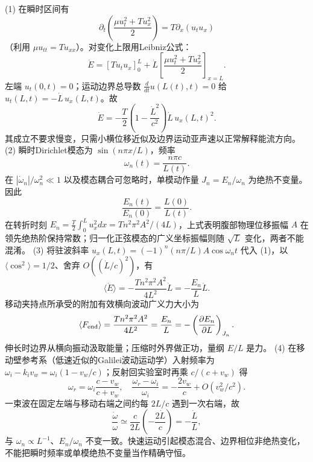(1) 在瞬时区间有
\[
\partial_t\!\left(\frac{\mu u_t^2+Tu_x^2}{2}\right)
=T\partial_x(u_tu_x)
\]
（利用 \(\mu u_{tt}=Tu_{xx}\)）。对变化上限用Leibniz公式：
\[
\dot E=[Tu_tu_x]_0^{L}+
\dot L\left[\frac{\mu u_t^2+Tu_x^2}{2}\right]_{x=L}.
\]
左端 \(u_t(0,t)=0\)；运动边界总导数 \(\frac d{dt}u(L(t),t)=0\) 给 \(u_t(L,t)=-\dot L\,u_x(L,t)\)。故
\[
\boxed{\dot E=-\frac T2\left(1-\frac{\dot L^2}{c^2}\right)\dot L\,u_x(L,t)^2}.
\]
其成立不要求慢变，只需小横位移近似及边界运动亚声速以正常解释能流方向。
(2) 瞬时Dirichlet模态为 \(\sin(n\pi x/L)\)，频率
\[
\omega_n(t)=\frac{n\pi c}{L(t)}.
\]
在 \(|\dot\omega_n|/\omega_n^2\ll1\) 以及模态耦合可忽略时，单模动作量 \(J_n=E_n/\omega_n\) 为绝热不变量。因此
\[
\frac{E_n(t)}{E_n(0)}=\frac{L(0)}{L(t)}.
\]
在转折时刻 \(E_n=\frac T2\int_0^L u_x^2 dx=Tn^2\pi^2A^2/(4L)\)，上式表明腹部物理位移振幅 \(A\) 在领先绝热阶保持常数；归一化正弦模态的广义坐标振幅则随 \(\sqrt L\) 变化，两者不能混淆。
(3) 将驻波斜率 \(u_x(L,t)=(-1)^n(n\pi/L)A\cos\omega_nt\) 代入 (1)，以 \(\langle\cos^2\rangle=1/2\)、舍弃 \(O((\dot L/c)^2)\)，有
\[
\langle \dot E\rangle=-\frac{Tn^2\pi^2A^2}{4L^2}\dot L
=-\frac{E_n}{L}\dot L.
\]
移动夹持点所承受的附加有效横向波动广义力大小为
\[
\langle F_{\rm end}\rangle
=\frac{Tn^2\pi^2A^2}{4L^2}=\frac{E_n}{L}
=-\left(\frac{\partial E_n}{\partial L}\right)_{J_n}.
\]
伸长时边界从横向振动汲取能量；压缩时外界做正功，量纲 \(E/L\) 是力。
(4) 在移动壁参考系（低速近似的Galilei波动运动学）入射频率为 \(\omega_i-k_i v_w=\omega_i(1-v_w/c)\)；反射回实验室时再乘 \(c/(c+v_w)\) 得
\[
\omega_r=\omega_i\frac{c-v_w}{c+v_w},
\quad\frac{\omega_r-\omega_i}{\omega_i}
=-\frac{2v_w}{c}+O(v_w^2/c^2).
\]
一束波在固定左端与移动右端之间约每 \(2L/c\) 遇到一次右端，故
\[
\frac{\dot\omega}{\omega}\simeq
\frac{c}{2L}\left(-\frac{2\dot L}{c}\right)
=-\frac{\dot L}{L},
\]
与 \(\omega_n\propto L^{-1}\)、\(E_n/\omega_n\) 不变一致。快速运动引起模态混合、边界相位非绝热变化，不能把瞬时频率或单模绝热不变量当作精确守恒。
